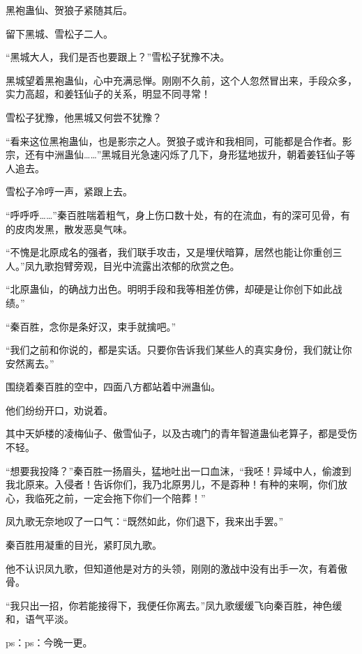 \begin{this_body}
黑袍蛊仙、贺狼子紧随其后。

留下黑城、雪松子二人。

“黑城大人，我们是否也要跟上？”雪松子犹豫不决。

黑城望着黑袍蛊仙，心中充满忌惮。刚刚不久前，这个人忽然冒出来，手段众多，实力高超，和姜钰仙子的关系，明显不同寻常！

雪松子犹豫，他黑城又何尝不犹豫？

“看来这位黑袍蛊仙，也是影宗之人。贺狼子或许和我相同，可能都是合作者。影宗，还有中洲蛊仙……”黑城目光急速闪烁了几下，身形猛地拔升，朝着姜钰仙子等人追去。

雪松子冷哼一声，紧跟上去。

“呼呼呼……”秦百胜喘着粗气，身上伤口数十处，有的在流血，有的深可见骨，有的皮肉发黑，散发恶臭气味。

“不愧是北原成名的强者，我们联手攻击，又是埋伏暗算，居然也能让你重创三人。”凤九歌抱臂旁观，目光中流露出浓郁的欣赏之色。

“北原蛊仙，的确战力出色。明明手段和我等相差仿佛，却硬是让你创下如此战绩。”

“秦百胜，念你是条好汉，束手就擒吧。”

“我们之前和你说的，都是实话。只要你告诉我们某些人的真实身份，我们就让你安然离去。”

围绕着秦百胜的空中，四面八方都站着中洲蛊仙。

他们纷纷开口，劝说着。

其中天妒楼的凌梅仙子、傲雪仙子，以及古魂门的青年智道蛊仙老算子，都是受伤不轻。

“想要我投降？”秦百胜一扬眉头，猛地吐出一口血沫，“我呸！异域中人，偷渡到我北原来。入侵者！告诉你们，我乃北原男儿，不是孬种！有种的来啊，你们放心，我临死之前，一定会拖下你们一个陪葬！”

凤九歌无奈地叹了一口气：“既然如此，你们退下，我来出手罢。”

秦百胜用凝重的目光，紧盯凤九歌。

他不认识凤九歌，但知道他是对方的头领，刚刚的激战中没有出手一次，有着傲骨。

“我只出一招，你若能接得下，我便任你离去。”凤九歌缓缓飞向秦百胜，神色缓和，语气平淡。

ps：ps：今晚一更。

\end{this_body}


